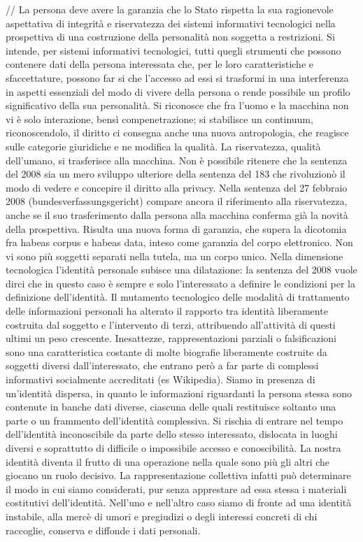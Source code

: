//
La persona deve avere la garanzia che lo Stato rispetta la sua ragionevole aspettativa di integrità e riservatezza dei sistemi informativi tecnologici nella prospettiva di una costruzione della personalità non soggetta a restrizioni. Si intende, per sistemi informativi tecnologici, tutti quegli strumenti che possono contenere dati della persona interessata che, per le loro caratteristiche e sfaccettature, possono far si che l’accesso ad essi si trasformi in una interferenza in aspetti essenziali del modo di vivere della persona o rende possibile un profilo significativo della sua personalità.
Si riconosce che fra l’uomo e la macchina non vi è solo interazione, bensì compenetrazione; si stabilisce un continuum, riconoscendolo, il diritto ci consegna anche una nuova antropologia, che reagisce sulle categorie giuridiche e ne modifica la qualità. La riservatezza, qualità dell’umano, si trasferisce alla macchina. Non è possibile ritenere che la sentenza del 2008 sia un mero sviluppo ulteriore della sentenza del 183 che rivoluzionò il modo di vedere e concepire il diritto alla privacy. Nella sentenza del 27 febbraio 2008 (bundesverfassungsgericht) compare ancora il riferimento alla riservatezza, anche se il suo trasferimento dalla persona alla macchina conferma già la novità della prospettiva. Risulta una nuova forma di garanzia, che supera la dicotomia fra habeas corpus e habeas data, inteso come garanzia del corpo elettronico. Non vi sono più soggetti separati nella tutela, ma un corpo unico.
Nella dimensione tecnologica l’identità personale subisce una dilatazione: la sentenza del 2008 vuole dirci che in questo caso è sempre e solo l’interessato a definire le condizioni per la definizione dell’identità. Il mutamento tecnologico delle modalità di trattamento delle informazioni personali ha alterato il rapporto tra identità liberamente costruita dal soggetto e l’intervento di terzi, attribuendo all’attività di questi ultimi un peso crescente. Inesattezze, rappresentazioni parziali o falsificazioni sono una caratteristica costante di molte biografie liberamente costruite da soggetti diversi dall’interessato, che entrano però a far parte di complessi informativi socialmente accreditati (es Wikipedia). Siamo in presenza di un’identità dispersa, in quanto le informazioni riguardanti la persona stessa sono contenute in banche dati diverse, ciascuna delle quali restituisce soltanto una parte o un frammento dell’identità complessiva. Si rischia di entrare nel tempo dell’identità inconoscibile da parte dello stesso interessato, dislocata in luoghi diversi e soprattutto di difficile o impossibile accesso e conoscibilità.
La nostra identità diventa il frutto di una operazione nella quale sono più gli altri che giocano un ruolo decisivo. La rappresentazione collettiva infatti può determinare il modo in cui siamo considerati, pur senza apprestare ad essa stessa i materiali costitutivi dell’identità.
Nell’uno e nell’altro caso siamo di fronte ad una identità instabile, alla mercè di umori e pregiudizi o degli interessi concreti di chi raccoglie, conserva e diffonde i dati personali.

